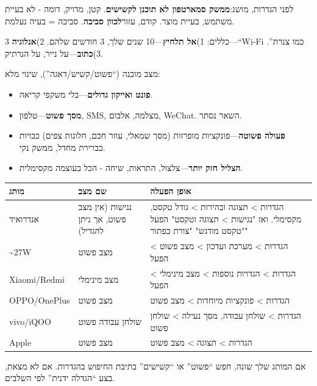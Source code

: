


לפני הגדרות, מושג:\textbf{ממשק סמארטפון לא תוכנן לקשישים}. קטן, מדויק, דומה - לא בעיית משתמש, בעיית מוצר. קודם, עזור\textbf{לכוון סביבה}. סביבה = בעיה נעלמת.

3 כללים: 1)\textbf{אל תלחיץ}—10 שנים שלך, 3 חודשים שלהם. 2)\textbf{אנלוגיה}—“Wi-Fi כמו צנרת”. 3)\textbf{כתוב}—על נייר, על הנרתיק.


מצב מובנה (“פשוט/קשיש/דאגה”), שינוי מלא:

\begin{itemize}
  \item \textbf{פונט ואייקון גדולים}—בלי משקפי קריאה.
  \item \textbf{מסך פשוט}—טלפון, SMS, מצלמה, אלבום, WeChat. השאר נסתר.
  \item \textbf{פעולה פשוטה}—פונקציות מופרזות (מסך שמאלי, עוזר חכם, חלונות צפים) כבויות כברירת מחדל, ממשק נקי.
  \item \textbf{הצליל חזק יותר}—צלצול, התראות, שיחה - הכל בעוצמה מקסימלית.
\end{itemize}


\begin{center}
\begin{tabularx}{\linewidth}{|X|X|X|}
\hline
\textbf{מותג} & \textbf{שם מצב} & \textbf{אופן הפעלה} \tabularnewline
\hline
אנדרואיד & נגישות (אין מצב פשוט, אך ניתן להגדיל) & הגדרות > תצוגה ובהירות > גודל טקסט, מקסימלי. ואז "נגישות > תצוגה וטקסט" הפעל "טקסט מודגש" "צורת כפתור" \tabularnewline
\textasciitilde{}27W & מצב פשוט & הגדרות > מערכת ועדכון > מצב פשוט > הפעל \tabularnewline
Xiaomi/Redmi & מצב מינימלי & הגדרות > הגדרות נוספות > מצב מינימלי > הפעל \tabularnewline
OPPO/OnePlus & מצב פשוט & הגדרות > פונקציות מיוחדות > מצב פשוט \tabularnewline
vivo/iQOO & שולחן עבודה פשוט & הגדרות > שולחן עבודה, מסך נעילה > שולחן פשוט \tabularnewline
Apple & מצב פשוט & הגדרות > תצוגה > מצב פשוט \tabularnewline
\hline
\end{tabularx}
\end{center}

אם המותג שלך שונה, חפש “פשוט” או “קשישים” בתיבת החיפוש בהגדרות. אם לא מצאת, בצע “הגדלה ידנית” לפי השלבים.

